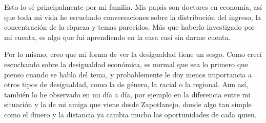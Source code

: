 \documentclass[12pt,letterpaper]{article}
\begin{document}
Esto lo sé principalmente por mi familia. Mis papás son doctores en economía, así que toda mi vida he escuchado conversaciones sobre la distribución del ingreso, la concentración de la riqueza y temas parecidos. Más que haberlo investigado por mi cuenta, es algo que fui aprendiendo en la casa casi sin darme cuenta.

Por lo mismo, creo que mi forma de ver la desigualdad tiene un sesgo. Como crecí escuchando sobre la desigualdad económica, es normal que sea lo primero que pienso cuando se habla del tema, y probablemente le doy menos importancia a otros tipos de desigualdad, como la de género, la racial o la regional. Aun así, también lo he observado en mi día a día, por ejemplo en la diferencia entre mi situación y la de mi amiga que viene desde Zapotlanejo, donde algo tan simple como el dinero y la distancia ya cambia mucho las oportunidades de cada quien.
\end{document}

